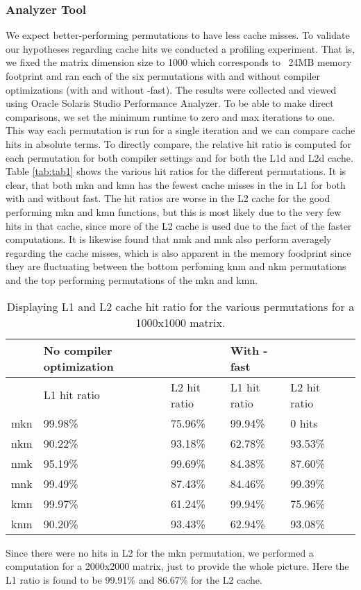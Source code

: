\subsubsection{Analyzer Tool}
We expect better-performing permutations to have less cache misses.   To validate our hypotheses regarding cache hits we conducted a profiling experiment. That is, we fixed the matrix dimension size to 1000 which corresponds to ~24MB memory footprint and ran each of the six permutations with and without compiler optimizations (with and without -fast). The results were collected and viewed using Oracle Solaris Studio Performance Analyzer. To be able to make direct comparisons, we set the minimum runtime to zero and max iterations to one. This way each permutation is run for a single iteration and we can compare cache hits in absolute terms. To directly compare, the relative hit ratio is computed for each permutation for both compiler settings and for both the L1d and L2d cache. \\
Table \ref{tab:tab1} shows the various hit ratios for the different permutations. It is clear, that both mkn and kmn has the fewest cache misses in the in L1 for both with and without fast. The hit ratios are worse in the L2 cache for the good performing mkn and kmn functions, but this is most likely due to the very few hits in that cache, since more of the L2 cache is used due to the fact of the faster computations. It is likewise found that nmk and mnk also perform averagely regarding the cache misses, which is also apparent in the memory foodprint since they are fluctuating between the bottom perfoming knm and nkm permutations and the top performing permutations of the mkn and kmn.


\begin{table}[h!]
\centering
\caption{Displaying L1 and L2 cache hit ratio for the various permutations for a 1000x1000 matrix.}
\label{Table:nat}
\begin{tabular}{|l|l|l||l|l|l|}
		\hline
 & No compiler optimization & & With -fast & \\ \hline
 & L1 hit ratio & L2 hit ratio & L1 hit ratio & L2 hit ratio \\ \hline
mkn & 99.98\%& 75.96\% & 99.94\% & 0 hits  \\  \hline
nkm & 90.22\% & 93.18\% &62.78\% & 93.53\% \\ \hline
nmk & 95.19\% & 99.69\% &84.38\% & 87.60\%   \\ \hline
mnk & 99.49\% & 87.43\% &84.46\% & 99.39\%  \\ \hline
kmn & 99.97\% & 61.24\% &99.94\% & 75.96\%  \\ \hline
knm & 90.20\% & 93.43\% &62.94\% & 93.08\%  \\ \hline
\end{tabular}
\end{table}

Since there were no hits in L2 for the mkn permutation, we performed a computation for a 2000x2000 matrix, just to provide the whole picture. Here the L1 ratio is found to be 99.91\% and 86.67\% for the L2 cache.